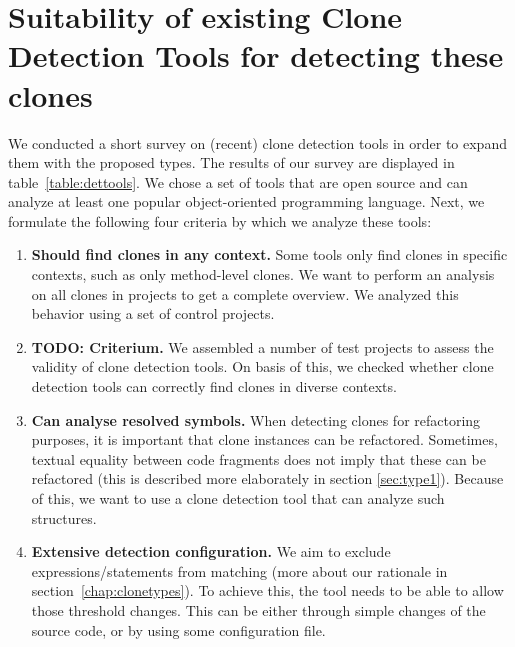 \section{Suitability of existing Clone Detection Tools for detecting these clones}
\label{ch:tool-overview}
We conducted a short survey on (recent) clone detection tools in order to expand them with the proposed types. The results of our survey are displayed in table~\ref{table:dettools}. We chose a set of tools that are open source and can analyze at least one popular object-oriented programming language. Next, we formulate the following four criteria by which we analyze these tools:
\begin{enumerate}
    \item \textbf{Should find clones in any context.} Some tools only find clones in specific contexts, such as only method-level clones. We want to perform an analysis on all clones in projects to get a complete overview. We analyzed this behavior using a set of control projects.
\item \textbf{TODO: Criterium.} We assembled a number of test projects to assess the validity of clone detection tools. On basis of this, we checked whether clone detection tools can correctly find clones in diverse contexts.
\item \textbf{Can analyse resolved symbols.} When detecting clones for refactoring purposes, it is important that clone instances can be refactored. Sometimes, textual equality between code fragments does not imply that these can be refactored (this is described more elaborately in section \ref{sec:type1}). Because of this, we want to use a clone detection tool that can analyze such structures.
\item \textbf{Extensive detection configuration.} We aim to exclude expressions/statements from matching (more about our rationale in section~\ref{chap:clonetypes}). To achieve this, the tool needs to be able to allow those threshold changes. This can be either through simple changes of the source code, or by using some configuration file.
\end{enumerate}

